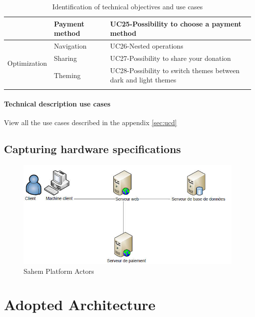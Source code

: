 \begin{longtable}{|m{10em}|m{10em}|m{10em}|}
                                           & \multirow{1}{*}{Payment method}          & UC25-Possibility to choose a payment method                     \\\hline
      \multirow{3}{*}{Optimization}        & \multirow{1}{*}{Navigation}              & UC26-Nested operations                                          \\\cline{2-3}
                                           & \multirow{1}{*}{Sharing}                 & UC27-Possibility to share your donation                         \\\cline{2-3}
                                           & \multirow{1}{*}{Theming}                 & UC28-Possibility to switch themes between dark and light themes \\\hline

      \caption{Identification of technical objectives and use cases}
      \label{tab:id_tech_objec_uc}
\end{longtable}

\paragraph{ Technical description use cases }
View all the use cases described in the appendix \ref{sec:ucd}


\subsection{Capturing hardware specifications}

\begin{figure}[!ht]
      \centering
      \includegraphics[scale=0.60]{assets/network-arch.jpg}
      \caption{Sahem Platform Actors}
      \label{fig:sahemactors}
\end{figure}

\section{Adopted Architecture}

